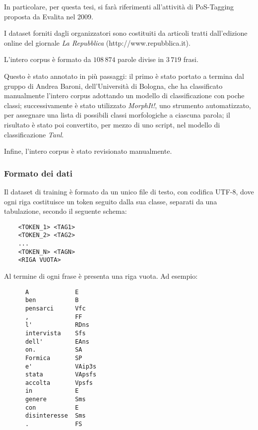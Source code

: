 In particolare, per questa tesi, si far\`a riferimenti all'attivit\`a di
PoS-Tagging proposta da Evalita nel 2009.

I dataset forniti dagli organizzatori sono costituiti da articoli tratti dall'edizione
online del giornale \emph{La Repubblica} (http://www.repubblica.it).

L'intero corpus \`e formato da $108\,874$ parole divise in $3\,719$ frasi.

Questo \`e stato annotato in pi\`u passaggi: il primo \`e stato portato a termina dal
gruppo di Andrea Baroni, dell'Universit\`a di Bologna, che ha classificato manualmente
l'intero corpus adottando un modello di classificazione con poche classi; successivamente
\`e stato utilizzato \emph{MorphIt!}, uno strumento automatizzato, per assegnare una lista di
possibili classi morfologiche a ciascuna parola; il risultato \`e stato poi convertito, per mezzo
di uno script, nel modello di classificazione \emph{Tanl}.

Infine, l'intero corpus \`e stato revisionato manualmente.

\subsubsection{Formato dei dati}
Il dataset di training \`e formato da un unico file di testo, con codifica UTF-8,
dove ogni riga costituisce un token seguito dalla sua classe, separati da una tabulazione,
secondo il seguente schema:

\begin{center}
  \begin{minipage}{5cm}
    \begin{verbatim}
    <TOKEN_1> <TAG1>
    <TOKEN_2> <TAG2>
    ...
    <TOKEN_N> <TAGN>
    <RIGA VUOTA>
    \end{verbatim}
  \end{minipage}
\end{center}

Al termine di ogni frase \`e presenta una riga vuota. Ad esempio:

\begin{center}
  \begin{minipage}{5cm}
    \begin{verbatim}
      A             E
      ben           B
      pensarci      Vfc
      ,             FF
      l'            RDns
      intervista    Sfs
      dell'         EAns
      on.           SA
      Formica       SP
      e'            VAip3s
      stata         VApsfs
      accolta       Vpsfs
      in            E
      genere        Sms
      con           E
      disinteresse  Sms
      .             FS

    \end{verbatim}
  \end{minipage}
\end{center}

